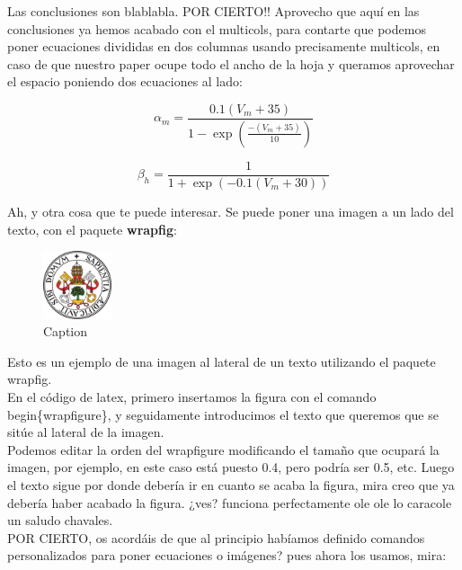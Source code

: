 \documentclass[12pt,a4paper]{article}
\begin{document}
Las conclusiones son blablabla. POR CIERTO!! Aprovecho que aquí en las conclusiones ya hemos acabado con el multicols, para contarte que podemos poner ecuaciones divididas en dos columnas usando precisamente multicols, en caso de que nuestro paper ocupe todo el ancho de la hoja y queramos aprovechar el espacio poniendo dos ecuaciones al lado:

\begin{multicols}{2}
\begin{equation}
    \alpha_{m}=\frac{0.1(V_{m}+35)}{1-\exp(\frac{-(V_{m}+35)}{10})}
    \label{ec:alpha_m}
\end{equation}

\begin{equation}
    \beta_{h}=\frac{1}{1+\exp(-0.1(V_{m}+30))}
    \label{ec:beta_h}
\end{equation}
\end{multicols}

Ah, y otra cosa que te puede interesar. Se puede poner una imagen a un lado del texto, con el paquete \textbf{wrapfig}:

\begin{figure}
\centering
\includegraphics[width=2cm]{fotos/escudo.png}
\caption{Caption}
\end{figure}

Esto es un ejemplo de una imagen al lateral de un texto utilizando el paquete wrapfig.\\
En el código de latex, primero insertamos la figura con el comando begin\{wrapfigure\}, y seguidamente introducimos el texto que queremos que se sitúe al lateral de la imagen.\\
Podemos editar la orden del wrapfigure modificando el tamaño que ocupará la imagen, por ejemplo, en este caso está puesto 0.4, pero podría ser 0.5, etc. Luego el texto sigue por donde debería ir en cuanto se acaba la figura, mira creo que ya debería haber acabado la figura. ¿ves? funciona perfectamente ole ole lo caracole un saludo chavales.\\[0.5cm]
POR CIERTO, os acordáis de que al principio habíamos definido comandos personalizados para poner ecuaciones o imágenes? pues ahora los usamos, mira:\\
\end{document}
